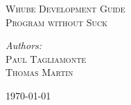 \begin{titlepage}

\begin{center}

\textsc{\LARGE Whube Development Guide}\\[1.5cm]
\textsc{\Large Program without Suck}\\[0.5cm]

\begin{minipage}{0.4\textwidth}
\begin{flushleft} \large
\emph{Authors:}\\
\textsc{Paul Tagliamonte} \\
\textsc{Thomas Martin}
\end{flushleft}
\end{minipage}
\begin{minipage}{0.4\textwidth}
\begin{flushright} \large
\end{flushright}
\end{minipage}

\vfill

{\large \today}

\end{center}

\end{titlepage}
